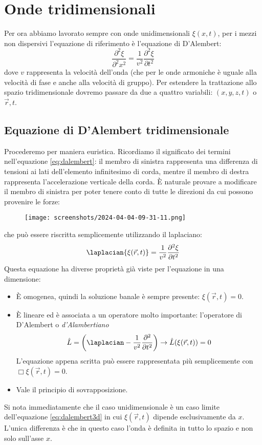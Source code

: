 \chapter{Onde tridimensionali}

Per ora abbiamo lavorato sempre con onde unidimensionali \(\xi (x,t)\), per i mezzi non dispersivi l'equazione di riferimento è l'equazione di D'Alembert:
\begin{equation}\label{eq:dalembert}
	\frac{\partial ^{2} \xi }{\partial ^{2} x^{2} }= \frac{1}{v^{2} }\frac{\partial ^{2} \xi }{\partial t ^{2} }  
\end{equation}
dove \(v\) rappresenta la velocità dell'onda (che per le onde armoniche è uguale alla velocità di fase e anche alla velocità di gruppo).
Per estendere la trattazione allo spazio tridimensionale dovremo passare da due a quattro variabili: \((x,y,z,t)\) o \(\vec{r} , t\).
\section{Equazione di D'Alembert tridimensionale}
Procederemo per maniera euristica. Ricordiamo il significato dei termini nell'equazione \eqref{eq:dalembert}: il membro di sinistra rappresenta una differenza di tensioni ai lati dell'elemento infinitesimo di corda, mentre il membro di destra rappresenta l'accelerazione verticale della corda. È naturale provare a modificare il membro di sinistra per poter tenere conto di tutte le direzioni da cui possono provenire le forze:
\begin{figure}[H]
	\centering
	\texttt{[image: screenshots/2024-04-04-09-31-11.png]}
\end{figure}
che può essere riscritta semplicemente utilizzando il laplaciano:
\begin{equation} \label{eq:dalembert3d}
	\laplacian{\xi (\vec{r} , t)}= \frac{1}{v^{2} }\frac{\partial ^{2} \xi }{\partial t ^{2} } 
\end{equation}
Questa equazione ha diverse proprietà già viste per l'equazione in una dimensione:
\begin{itemize}
	\item È omogenea, quindi la soluzione banale è sempre presente: \(\xi (\vec{r} , t)=0\).
	\item È lineare ed è associata a un operatore molto importante: l'operatore di D'Alembert o \emph{d'Alambertiano}
	\[
		\hat{L} = \left( \laplacian - \frac{1}{v^{2} }\frac{\partial ^{2} }{\partial t ^{2} }  \right) \to \hat{L} (\xi (\vec{r} , t))=0
	\]
	L'equazione appena scritta può essere rappresentata più semplicemente con \(\Box \xi (\vec{r} , t) = 0\).	
	\item Vale il principio di sovrapposizione.
\end{itemize}
Si nota immediatamente che il caso unidimensionale è un caso limite dell'equazione \eqref{eq:dalembert3d} in cui \(\xi (\vec{r} , t)\) dipende esclusivamente da \(x\). L'unica differenza è che in questo caso l'onda è definita in tutto lo spazio e non solo sull'asse \(x\).

